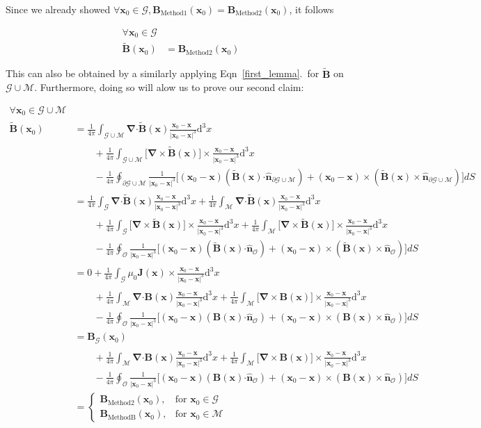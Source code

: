 \documentclass{article}
\newcommand\B{\mathbf{B}}
\newcommand\J{\mathbf{J}}
\newcommand\x{\mathbf{x}}
\newcommand\M{\mathcal{M}}
\newcommand\G{\mathcal{G}}
\newcommand\Out{\mathcal{O}}
\newcommand\GcupM{\G \cup \M}
\newcommand\ifpi{\frac{1}{4\pi}}
\newcommand\dive[1]{\boldsymbol{\nabla} \boldsymbol{\cdot} #1}
\newcommand\curl[1]{\boldsymbol{\nabla} \times #1}
\newcommand\normal[1]{\mathbf{\hat{n}}_{#1}}
\newcommand\dV{\mathrm{d}^3x}
\newcommand\xoverx{\frac{\phantom{|} \x_0-\x \phantom{|^3}}{| \x_0-\x |^3}}
\newcommand\surf[2]{\frac{1}{|\x_0-\x|^3} \Big[(\x_0-\x) (#2 \boldsymbol{\cdot} #1) + (\x_0-\x)\times (#2 \times #1) \Big]}
\newcommand\coulombInt[1]{\ifpi \int_{#1} \dive{\B}(\x) \xoverx \dV}
\newcommand\coulombIntTilde[1]{\ifpi \int_{#1} \dive{\tilde{\B}}(\x) \xoverx \dV}
\newcommand\biotsavInt[1]{\ifpi \int_{#1} \big[ \curl{\B}(\x) \big] \times \xoverx \dV}
\newcommand\biotsavIntTilde[1]{\ifpi \int_{#1} \big[ \curl{\tilde{\B}}(\x) \big] \times \xoverx \dV}
\newcommand\biotsavIntJ[1]{\ifpi \int_{#1} \mu_0 \J(\x) \times \xoverx \dV}
\newcommand\surfInt[1]     {\ifpi \oint_{#1} \surf{\normal{#1}}{\B(\x)} dS}
\newcommand\surfIntTilde[1]{\ifpi \oint_{#1} \surf{\normal{#1}}{\tilde{\B}(\x)} dS}
\begin{document}

Since we already showed $\forall \x_0 \in \G, \B_{\text{Method1}}(\x_0) = \B_{\text{Method2}}(\x_0)$,
it follows

\begin{align}
\forall \x_0 \in \G \\
  \tilde{\B}(\x_0) &= \B_{\text{Method2}}(\x_0)
\end{align}

This can also be obtained by a similarly applying Eqn~\ref{first_lemma}.~for $\tilde{\B}$ on $\GcupM$. Furthermore, doing so will alow us to prove our second claim:

\begin{align}
\forall \x_0 \in \GcupM \\
  \tilde{\B}(\x_0) &= \coulombIntTilde{\GcupM} \nonumber \\
                    &\qquad + \biotsavIntTilde{\GcupM} \nonumber \\
                    &\qquad - \surfIntTilde{\partial \GcupM} \nonumber \\
                   &= \coulombIntTilde{\G} + \coulombIntTilde{\M} \nonumber \\
                    &\qquad + \biotsavIntTilde{\G} + \biotsavIntTilde{\M} \nonumber \\
                    &\qquad - \surfIntTilde{\Out} \nonumber \\
                   &= 0 + \biotsavIntJ{\G} \nonumber \\
                    &\qquad + \coulombInt{\M} + \biotsavInt{\M} \nonumber \\
                    &\qquad - \surfInt{\Out} \nonumber \\
                   &= \B_{\G}(\x_0) \nonumber \\
                    &\qquad + \coulombInt{\M} + \biotsavInt{\M} \nonumber \\
                    &\qquad - \surfInt{\Out} \nonumber \\
                   &=
    \begin{cases}
        \B_{\text{Method2}}(\x_0), & \text{for } \x_0 \in \G \\
        \B_{\text{MethodB}}(\x_0), & \text{for } \x_0 \in \M
    \end{cases}
\end{align}
\end{document}
